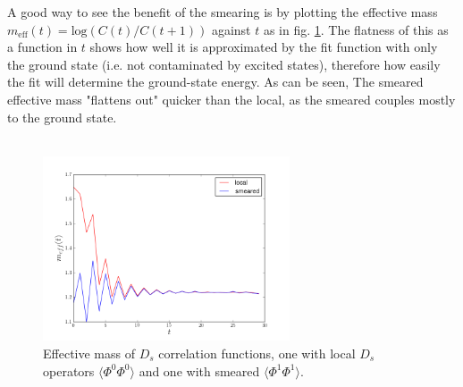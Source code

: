 A good way to see the benefit of the smearing is by plotting the effective mass $m_{\text{eff}}(t) = \text{log}({C(t)/C(t+1)})$ against $t$ as in fig. \ref{fig:effmass}. The flatness of this as a function in $t$ shows how well it is approximated by the fit function with only the ground state (i.e. not contaminated by excited states), therefore how easily the fit will determine the ground-state energy. As can be seen, The smeared effective mass "flattens out" quicker than the local, as the smeared couples mostly to the ground state.
\\ \\
\begin{figure}
  \begin{center}
    \includegraphics[width=0.65\textwidth]{images/NRQCD/EffMass_localVsSmear_Ds_coarse.png}
  \end{center}
  \caption{Effective mass of $D_s$ correlation functions, one with local $D_s$ operators $\langle\Phi^0\Phi^0\rangle$ and one with smeared $\langle\Phi^1\Phi^1\rangle$.}
  \label{fig:effmass}
\end{figure}

